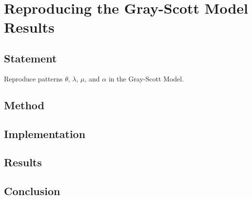 \section{Reproducing the Gray-Scott Model Results}

\subsection{Statement}
Reproduce patterns $\theta$, $\lambda$, $\mu$, and $\alpha$ in the Gray-Scott Model.


\subsection{Method}
\subsection{Implementation}
\subsection{Results}
\subsection{Conclusion}
